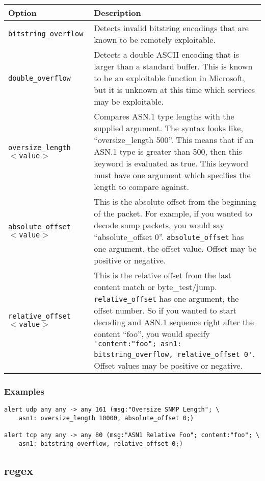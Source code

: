 \documentclass[english]{report}
\begin{document}
\begin{tabular}{| l | p{5in} |}
\hline
{\bf Option} & {\bf Description}\\
\hline
\hline
\texttt{bitstring\_overflow} & Detects invalid bitstring encodings that are known to be remotely exploitable. \\
\hline
\texttt{double\_overflow} & Detects a double ASCII encoding that is larger than a standard buffer.  This is known to be an exploitable function in Microsoft, but it is unknown at this time which services may be exploitable. \\
\hline
\texttt{oversize\_length $<$value$>$} & Compares ASN.1 type lengths with the supplied argument.  The syntax looks like, ``oversize\_length 500''.  This means that if an ASN.1 type is greater than 500, then this keyword is evaluated as true.  This keyword must have one argument which specifies the length to compare against. \\
\hline
\texttt{absolute\_offset $<$value$>$} & This is the absolute offset from the beginning of the packet.  For example, if you wanted to decode snmp packets, you would say ``absolute\_offset 0''.  \texttt{absolute\_offset} has one argument, the offset value.  Offset may be positive or negative. \\  
\hline
\texttt{relative\_offset $<$value$>$} & This is the relative offset from the last content match or byte\_test/jump.  \texttt{relative\_offset} has one argument, the offset number.  So if you wanted to start decoding and ASN.1 sequence right after the content ``foo'', you would specify \verb!'content:"foo"; asn1: bitstring_overflow, relative_offset 0'!.  Offset values may be positive or negative. \\ 
\hline
\end{tabular}

\subsubsection{Examples}

\begin{verbatim}
alert udp any any -> any 161 (msg:"Oversize SNMP Length"; \
    asn1: oversize_length 10000, absolute_offset 0;)
    
alert tcp any any -> any 80 (msg:"ASN1 Relative Foo"; content:"foo"; \
    asn1: bitstring_overflow, relative_offset 0;)
\end{verbatim}



\subsection{regex}
\end{document}
